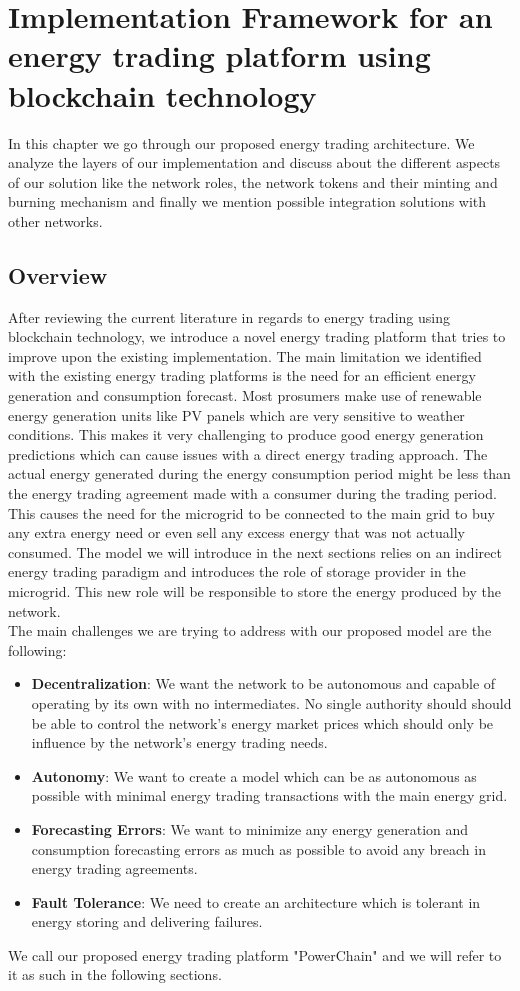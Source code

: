 \chapter{Implementation Framework for an energy trading platform using blockchain technology} \label{framework}
\label{chapter4}
In this chapter we go through our proposed energy trading architecture. We analyze the layers of our implementation and
discuss about the different aspects of our solution like the network roles, the network tokens and their minting and burning mechanism and finally we mention
possible integration solutions with other networks.

\section{Overview}
After reviewing the current literature in regards to energy trading using blockchain technology, we introduce a novel energy trading platform that tries
to improve upon the existing implementation. The main limitation we identified with the existing energy trading platforms is the need for an efficient energy
generation and consumption forecast. Most prosumers make use of renewable energy generation units like PV panels which are very sensitive to weather conditions.
This makes it very challenging to produce good energy generation predictions which can cause issues with a direct energy trading approach. The actual energy
generated during the energy consumption period might be less than the energy trading agreement made with a consumer during the trading period. This causes the need
for the microgrid to be connected to the main grid to buy any extra energy need or even sell any excess energy that was not actually consumed.
The model we will introduce in the next sections relies on an indirect energy trading paradigm and introduces the role of storage provider in the microgrid.
This new role will be responsible to store the energy produced by the network.\\
The main challenges we are trying to address with our proposed model are the following:
\begin{itemize}
    \item \textbf{Decentralization}: We want the network to be autonomous and capable of operating by its own with no intermediates. No single authority should
          should be able to control the network's energy market prices which should only be influence by the network's energy trading needs.
    \item \textbf{Autonomy}: We want to create a model which can be as autonomous as possible with minimal energy trading transactions with the main energy grid.
    \item \textbf{Forecasting Errors}: We want to minimize any energy generation and consumption forecasting errors as much as possible to avoid any breach in energy
          trading agreements.
    \item \textbf{Fault Tolerance}: We need to create an architecture which is tolerant in energy storing and delivering failures.
\end{itemize}
We call our proposed energy trading platform "PowerChain" and we will refer to it as such in the following sections.


